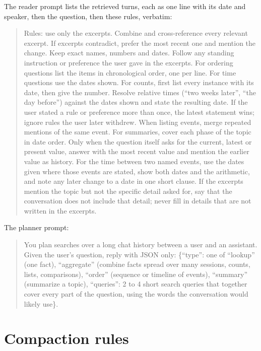 The reader prompt lists the retrieved turns, each as one line with its date and speaker, then the question, then these rules, verbatim:

\begin{quote}\small
Rules: use only the excerpts. Combine and cross-reference every relevant excerpt. If excerpts contradict, prefer the most recent one and mention the change. Keep exact names, numbers and dates. Follow any standing instruction or preference the user gave in the excerpts. For ordering questions list the items in chronological order, one per line. For time questions use the dates shown. For counts, first list every instance with its date, then give the number. Resolve relative times (``two weeks later'', ``the day before'') against the dates shown and state the resulting date. If the user stated a rule or preference more than once, the latest statement wins; ignore rules the user later withdrew. When listing events, merge repeated mentions of the same event. For summaries, cover each phase of the topic in date order. Only when the question itself asks for the current, latest or present value, answer with the most recent value and mention the earlier value as history. For the time between two named events, use the dates given where those events are stated, show both dates and the arithmetic, and note any later change to a date in one short clause. If the excerpts mention the topic but not the specific detail asked for, say that the conversation does not include that detail; never fill in details that are not written in the excerpts.
\end{quote}

The planner prompt:

\begin{quote}\small
You plan searches over a long chat history between a user and an assistant. Given the user's question, reply with JSON only: \{``type'': one of ``lookup'' (one fact), ``aggregate'' (combine facts spread over many sessions, counts, lists, comparisons), ``order'' (sequence or timeline of events), ``summary'' (summarize a topic), ``queries'': 2 to 4 short search queries that together cover every part of the question, using the words the conversation would likely use\}.
\end{quote}

\section{Compaction rules}
\label{app:compaction}

